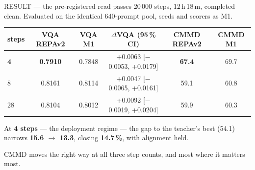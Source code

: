 \documentclass[10pt,aspectratio=169]{beamer}
\newcommand{\good}[1]{\textcolor{good}{\textbf{#1}}}
\begin{document}
\begin{frame}{RESULT --- the pre-registered read passes}
  20\,000 steps, 12\,h\,18\,m, completed clean. Evaluated on the identical 640-prompt pool,
  seeds and scorers as M1.

  \begin{center}
  \begin{tabular}{lccccc}
    \toprule
    steps & VQA REPAv2 & VQA M1 & $\Delta$VQA (95\,\% CI) & CMMD REPAv2 & CMMD M1 \\
    \midrule
    \textbf{4} & \textbf{0.7910} & 0.7848 & +0.0063 [$-$0.0053, +0.0179] & \good{67.4} & 69.7 \\
    8 & 0.8161 & 0.8114 & +0.0047 [$-$0.0065, +0.0161] & 59.1 & 60.8 \\
    28 & 0.8104 & 0.8012 & +0.0092 [$-$0.0019, +0.0204] & 59.9 & 60.3 \\
    \bottomrule
  \end{tabular}
  \end{center}

  \vspace{0.5em}
  At \textbf{4 steps} --- the deployment regime --- the gap to the teacher's best (54.1) narrows
  \good{15.6 $\rightarrow$ 13.3}, closing \good{14.7\,\%}, with alignment held.

  \vspace{0.5em}
  CMMD moves the right way at all three step counts, and most where it matters most.
\end{frame}
\end{document}
